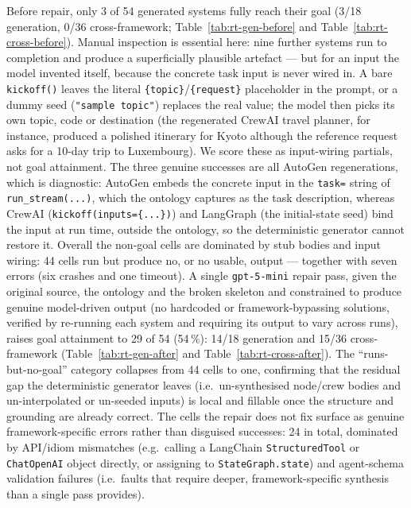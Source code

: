 Before repair, only 3 of 54 generated systems fully reach their goal (3/18
generation, 0/36 cross-framework; Table~\ref{tab:rt-gen-before} and
Table~\ref{tab:rt-cross-before}). Manual inspection is essential here: nine
further systems run to completion and produce a superficially plausible
artefact --- but for an input the model invented itself, because the concrete
task input is never wired in. A bare \texttt{kickoff()} leaves the literal
\texttt{\{topic\}}/\texttt{\{request\}} placeholder in the prompt, or a dummy
seed (\texttt{"sample topic"}) replaces the real value; the model then picks
its own topic, code or destination (the regenerated CrewAI travel planner, for
instance, produced a polished itinerary for Kyoto although the reference
request asks for a 10-day trip to Luxembourg). We score these as input-wiring
partials, not goal attainment. The three genuine successes are all AutoGen
regenerations, which is diagnostic: AutoGen embeds the concrete input in the
\texttt{task=} string of \texttt{run\_stream(...)}, which the ontology captures
as the task description, whereas CrewAI (\texttt{kickoff(inputs=\{...\})}) and
LangGraph (the initial-state seed) bind the input at run time, outside the
ontology, so the deterministic generator cannot restore it. Overall the
non-goal cells are dominated by stub bodies and input wiring: 44 cells run
but produce no, or no usable, output --- together with seven errors (six
crashes and one timeout). A single \texttt{gpt-5-mini} repair pass, given the
original source, the ontology and the broken skeleton and constrained to
produce genuine model-driven output (no hardcoded or framework-bypassing
solutions, verified by re-running each system and requiring its output to vary
across runs), raises goal attainment to 29 of 54 (54\,\%): 14/18 generation
and 15/36 cross-framework (Table~\ref{tab:rt-gen-after} and
Table~\ref{tab:rt-cross-after}). The ``runs-but-no-goal'' category collapses
from 44 cells to one, confirming that the residual gap the deterministic
generator leaves (i.e.\ un-synthesised node/crew bodies and un-interpolated or
un-seeded inputs) is local and fillable once the structure and grounding are
already correct. The cells the repair does not fix surface as genuine
framework-specific errors rather than disguised successes: 24 in total,
dominated by API/idiom mismatches (e.g.\ calling a LangChain
\texttt{StructuredTool} or \texttt{ChatOpenAI} object directly, or assigning to
\texttt{StateGraph.state}) and agent-schema validation failures (i.e.\ faults
that require deeper, framework-specific synthesis than a single pass provides).

